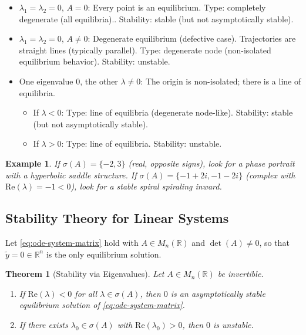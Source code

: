 \documentclass{article}
\newtheorem{theorem}{Theorem}
\newtheorem*{example}{Example}
\newcommand{\R}{\mathbb{R}}
\begin{document}
\begin{itemize}
    \item $\lambda_1 = \lambda_2 = 0$, $A = 0$: Every point is an equilibrium. Type: completely degenerate (all equilibria).. Stability: stable (but not asymptotically stable).

    \item $\lambda_1 = \lambda_2 = 0$, $A \neq 0$: Degenerate equilibrium (defective case). Trajectories are straight lines (typically parallel). Type: degenerate node (non-isolated equilibrium behavior). Stability: unstable.

    \item One eigenvalue $0$, the other $\lambda \neq 0$: The origin is non-isolated; there is a line of equilibria.
    \begin{itemize}
        \item If $\lambda < 0$: Type: line of equilibria (degenerate node-like). Stability: stable (but not asymptotically stable).

        \item If $\lambda > 0$: Type: line of equilibria. Stability: unstable.
    \end{itemize}
\end{itemize}
\begin{example}
    If $\sigma(A) = \{-2, 3\}$ (real, opposite signs), look for a phase portrait with a hyperbolic saddle structure. If $\sigma(A) = \{-1 + 2i, -1 - 2i\}$ (complex with $\mathrm{Re}(\lambda) = -1 < 0$), look for a stable spiral spiraling inward.
\end{example}

\subsection{Stability Theory for Linear Systems}

Let \eqref{eq:ode-system-matrix} hold with $A \in M_n(\R)$ 
and $\det(A) \neq 0$, so that $\tilde{y} = 0 \in \R^n$ is 
the only equilibrium solution.

\begin{theorem}[Stability via Eigenvalues]
    Let $A \in M_n(\R)$ be invertible.
    \begin{enumerate}
        \item If $\mathrm{Re}(\lambda) < 0$ for all 
        $\lambda \in \sigma(A)$, then $0$ is an asymptotically 
        stable equilibrium solution of \eqref{eq:ode-system-matrix}.
        \item If there exists $\lambda_0 \in \sigma(A)$ with 
        $\mathrm{Re}(\lambda_0) > 0$, then $0$ is unstable.
    \end{enumerate}
\end{theorem}
\end{document}
